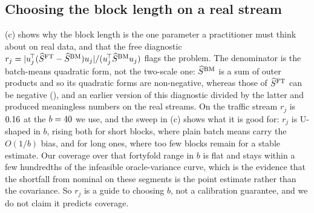 \subsection{Choosing the block length on a real stream}
\label{app:realb}

(c) shows why the block length is the one parameter a practitioner must think
about on real data, and that the free diagnostic
$r_j=|u_j^{\!\top}(\widehat{S}^{\mathrm{FT}}-\widehat{S}^{\mathrm{BM}})u_j|/(u_j^{\!\top}\widehat{S}^{\mathrm{BM}} u_j)$ flags the problem. The denominator is
the batch-means quadratic form, not the two-scale one: $\widehat{S}^{\mathrm{BM}}$ is a sum of outer products and so
its quadratic forms are non-negative, whereas those of $\widehat{S}^{\mathrm{FT}}$ can be negative
(), and an earlier version of this diagnostic divided by the latter and produced
meaningless numbers on the real streams. On the traffic stream $r_j$ is
$0.16$ at the $b=40$ we use, and the sweep in (c) shows what it is
good for: $r_j$ is U-shaped in $b$, rising both for short blocks, where plain batch means carry the
$O(1/b)$ bias, and for long ones, where too few blocks remain for a stable estimate. Our coverage
over that fortyfold range in $b$ is flat and stays within a few hundredths of the infeasible
oracle-variance curve, which is the evidence that the shortfall from nominal on these segments is
the point estimate rather than the covariance. So $r_j$ is a guide to choosing $b$, not a
calibration guarantee, and we do not claim it predicts coverage.
